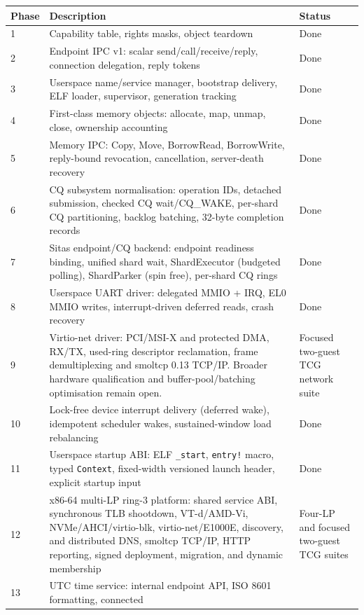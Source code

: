 \begin{longtable}{|p{1.1cm}|p{7.4cm}|p{3cm}|}
\hline
\textbf{Phase} & \textbf{Description} & \textbf{Status} \\
\hline
1 & Capability table, rights masks, object teardown & Done \\
2 & Endpoint IPC v1: scalar send/call/receive/reply, connection delegation,
    reply tokens & Done \\
3 & Userspace name/service manager, bootstrap delivery, ELF loader,
    supervisor, generation tracking & Done \\
4 & First-class memory objects: allocate, map, unmap, close, ownership
    accounting & Done \\
5 & Memory IPC: Copy, Move, BorrowRead, BorrowWrite, reply-bound revocation,
    cancellation, server-death recovery & Done \\
6 & CQ subsystem normalisation: operation IDs, detached submission,
    checked CQ wait/CQ\_WAKE, per-shard CQ partitioning, backlog batching, 32-byte
    completion records & Done \\
7 & Sitas endpoint/CQ backend: endpoint readiness binding, unified shard
    wait, ShardExecutor (budgeted polling), ShardParker (spin free),
    per-shard CQ rings & Done \\
8 & Userspace UART driver: delegated MMIO + IRQ, EL0 MMIO writes,
    interrupt-driven deferred reads, crash recovery & Done \\
9 & Virtio-net driver: PCI/MSI-X and protected DMA, RX/TX, used-ring
    descriptor reclamation, frame demultiplexing and smoltcp 0.13 TCP/IP.
    Broader hardware qualification and buffer-pool/batching optimisation remain
    open. &
    Focused two-guest TCG network suite \\
10 & Lock-free device interrupt delivery (deferred wake), idempotent scheduler
    wakes, sustained-window load rebalancing & Done \\
11 & Userspace startup ABI: ELF \texttt{\_start}, \texttt{entry!} macro, typed
    \texttt{Context}, fixed-width versioned launch header, explicit startup
    input & Done \\
12 & x86-64 multi-LP ring-3 platform: shared service ABI, synchronous TLB
    shootdown, VT-d/AMD-Vi, NVMe/AHCI/virtio-blk, virtio-net/E1000E, discovery, and
    distributed DNS, smoltcp TCP/IP, HTTP reporting, signed deployment,
    migration, and dynamic membership & Four-LP and focused two-guest TCG suites \\
13 & UTC time service: internal endpoint API, ISO 8601 formatting, connected

\end{longtable}
